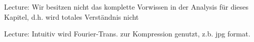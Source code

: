 Lecture: Wir besitzen nicht das komplette Vorwissen in der Analysis für dieses Kapitel, d.h. wird totales Verständnis nicht 

Lecture: Intuitiv wird Fourier-Trans. zur Kompression genutzt, z.b. jpg format.
